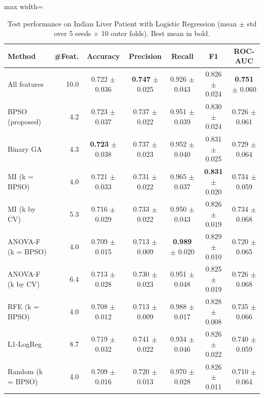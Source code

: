 \begin{table}[!t]
\centering
\caption{Test performance on Indian Liver Patient with Logistic Regression (mean $\pm$ std over 5 seeds $\times$ 10 outer folds). Best mean in bold.}
\label{tab:results_ilpd}
\footnotesize
\setlength{\tabcolsep}{4pt}
\begin{adjustbox}{max width=\linewidth}
\begin{tabular}{lrccccc}
\toprule
\textbf{Method} & \textbf{\#Feat.} & \textbf{Accuracy} & \textbf{Precision} & \textbf{Recall} & \textbf{F1} & \textbf{ROC-AUC} \\
\midrule
All features & 10.0 & 0.722 $\pm$ 0.036 & \textbf{0.747} $\pm$ 0.025 & 0.926 $\pm$ 0.043 & 0.826 $\pm$ 0.024 & \textbf{0.751} $\pm$ 0.060 \\
BPSO (proposed) & 4.2 & 0.723 $\pm$ 0.037 & 0.737 $\pm$ 0.022 & 0.951 $\pm$ 0.039 & 0.830 $\pm$ 0.024 & 0.726 $\pm$ 0.061 \\
Binary GA & 4.3 & \textbf{0.723} $\pm$ 0.038 & 0.737 $\pm$ 0.023 & 0.952 $\pm$ 0.040 & 0.831 $\pm$ 0.025 & 0.729 $\pm$ 0.064 \\
MI (k = BPSO) & 4.0 & 0.721 $\pm$ 0.033 & 0.731 $\pm$ 0.022 & 0.965 $\pm$ 0.037 & \textbf{0.831} $\pm$ 0.020 & 0.734 $\pm$ 0.059 \\
MI (k by CV) & 5.3 & 0.716 $\pm$ 0.029 & 0.733 $\pm$ 0.022 & 0.950 $\pm$ 0.043 & 0.826 $\pm$ 0.019 & 0.734 $\pm$ 0.068 \\
ANOVA-F (k = BPSO) & 4.0 & 0.709 $\pm$ 0.015 & 0.713 $\pm$ 0.009 & \textbf{0.989} $\pm$ 0.020 & 0.829 $\pm$ 0.010 & 0.720 $\pm$ 0.065 \\
ANOVA-F (k by CV) & 6.4 & 0.713 $\pm$ 0.028 & 0.730 $\pm$ 0.023 & 0.951 $\pm$ 0.048 & 0.825 $\pm$ 0.019 & 0.726 $\pm$ 0.068 \\
RFE (k = BPSO) & 4.0 & 0.708 $\pm$ 0.012 & 0.713 $\pm$ 0.009 & 0.988 $\pm$ 0.017 & 0.828 $\pm$ 0.008 & 0.735 $\pm$ 0.066 \\
L1-LogReg & 8.7 & 0.719 $\pm$ 0.032 & 0.741 $\pm$ 0.022 & 0.934 $\pm$ 0.046 & 0.826 $\pm$ 0.022 & 0.740 $\pm$ 0.059 \\
Random (k = BPSO) & 4.0 & 0.709 $\pm$ 0.016 & 0.720 $\pm$ 0.013 & 0.970 $\pm$ 0.028 & 0.826 $\pm$ 0.011 & 0.710 $\pm$ 0.064 \\
\bottomrule
\end{tabular}
\end{adjustbox}
\end{table}
